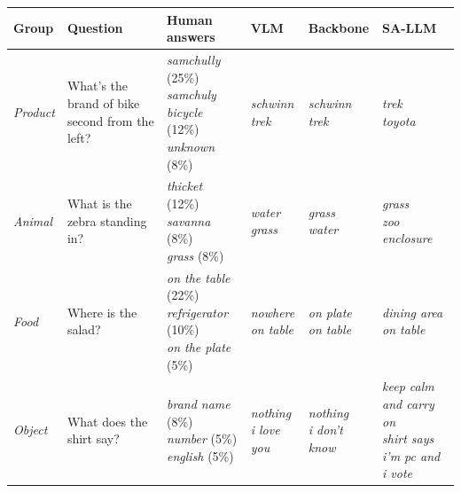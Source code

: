 \begin{table}[h]
\centering

\setlength{\tabcolsep}{4pt}
\renewcommand{\arraystretch}{1.15}

\begin{tabular}{>{\raggedright\arraybackslash}p{1.0cm}>{\raggedright\arraybackslash}p{4.4cm}>{\raggedright\arraybackslash}p{3.6cm}>{\raggedright\arraybackslash}p{2.2cm}>{\raggedright\arraybackslash}p{2.2cm}>{\raggedright\arraybackslash}p{2.2cm}}
\toprule
\textbf{Group} & \textbf{Question} & \textbf{Human answers} & \textbf{VLM} & \textbf{Backbone} & \textbf{SA-LLM} \\
\midrule
\textit{Product} & What's the brand of bike second from the left? & \makecell[l]{\textit{samchully} (25\%) \\ \textit{samchuly bicycle} (12\%) \\ \textit{unknown} (8\%)} & \makecell[l]{\textit{schwinn} \\ \textit{trek}} & \makecell[l]{\textit{schwinn} \\ \textit{trek}} & \makecell[l]{\textit{trek} \\ \textit{toyota}} \\
\midrule
\textit{Animal} & What is the zebra standing in? & \makecell[l]{\textit{thicket} (12\%) \\ \textit{savanna} (8\%) \\ \textit{grass} (8\%)} & \makecell[l]{\textit{water} \\ \textit{grass}} & \makecell[l]{\textit{grass} \\ \textit{water}} & \makecell[l]{\textit{grass} \\ \textit{zoo enclosure}} \\
\midrule
\textit{Food} & Where is the salad? & \makecell[l]{\textit{on the table} (22\%) \\ \textit{refrigerator} (10\%) \\ \textit{on the plate} (5\%)} & \makecell[l]{\textit{nowhere} \\ \textit{on table}} & \makecell[l]{\textit{on plate} \\ \textit{on table}} & \makecell[l]{\textit{dining area} \\ \textit{on table}} \\
\midrule
\textit{Object} & What does the shirt say? & \makecell[l]{\textit{brand name} (8\%) \\ \textit{number} (5\%) \\ \textit{english} (5\%)} & \makecell[l]{\textit{nothing} \\ \textit{i love you}} & \makecell[l]{\textit{nothing} \\ \textit{i don't know}} & \makecell[l]{\textit{keep calm and carry on} \\ \textit{shirt says i'm pc and i vote}} \\

\end{tabular}
\end{table}

